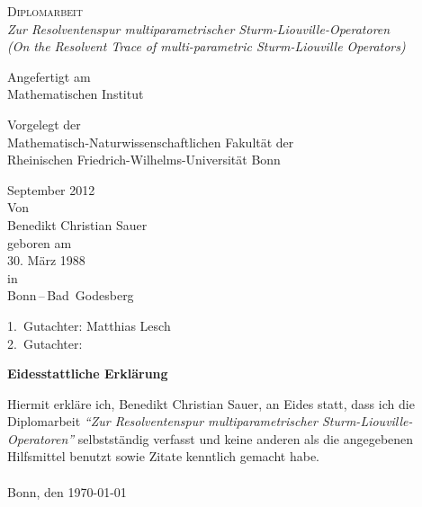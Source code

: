 \documentclass[paper=a4,twoside,parskip=full]{scrartcl}
\author{Benedikt Christian Sauer}
\title{\Thema}
\numberwithin{equation}{section}
\numberwithin{theorem}{section}
\numberwithin{Remark}{section}
\numberwithin{Lemma}{section}
\newcommand{\Thema}{Zur Resolventenspur multiparametrischer
Sturm-Liouville-Operatoren}
\newcommand{\ThemaEn}{On the Resolvent Trace of multi-parametric Sturm-Liouville Operators}
\begin{document}
\begin{titlepage}
  \begin{center}
      \textsc{Diplomarbeit} \\
      \bigskip
      \textit{\Thema} \\
      \textit{(\ThemaEn)}
  \end{center}
  \begin{center}
      Angefertigt am \\
      Mathematischen Institut
  \end{center}
  \begin{center}
      Vorgelegt der \\
      Mathematisch-Naturwissenschaftlichen Fakultät der \\
      Rheinischen Friedrich-Wilhelms-Universität Bonn
  \end{center}
  \begin{center}
      September 2012 \\
      \bigskip
      Von \\
      \bigskip
      Benedikt Christian Sauer \\
      \bigskip
      geboren am \\
      30. März 1988 \\
      in \\
      Bonn\,--\,Bad~Godesberg
  \end{center}
\end{titlepage}
\newpage
\tableofcontents
\vfill
\begin{center}
  \large 1.\ Gutachter: Matthias Lesch \\
  \large 2.\ Gutachter: \\
\end{center}
\newpage
{}







\appendix


\newpage
{}
\pagestyle{plain}
\begin{center}
    \textbf{\large Eidesstattliche Erklärung}
\end{center}
\vspace{2cm}
Hiermit erkläre ich, Benedikt Christian Sauer, an Eides statt, dass ich die
Diplomarbeit \textit{"`\Thema"'} selbstständig verfasst und keine anderen als
die angegebenen Hilfsmittel benutzt sowie Zitate kenntlich gemacht habe. \\
\vspace{2cm} \\
Bonn, den \today
\end{document}
